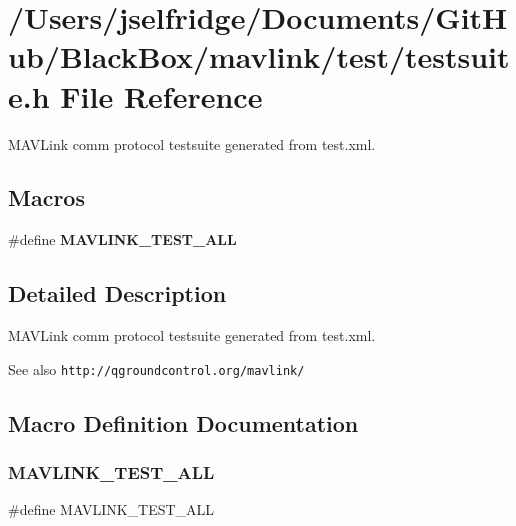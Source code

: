 \section{/\+Users/jselfridge/\+Documents/\+Git\+Hub/\+Black\+Box/mavlink/test/testsuite.h File Reference}
\label{test_2testsuite_8h}


M\+A\+V\+Link comm protocol testsuite generated from test.\+xml.  


\subsection*{Macros}
\begin{DoxyCompactItemize}
\item 
\#define \textbf{ M\+A\+V\+L\+I\+N\+K\+\_\+\+T\+E\+S\+T\+\_\+\+A\+LL}
\end{DoxyCompactItemize}


\subsection{Detailed Description}
M\+A\+V\+Link comm protocol testsuite generated from test.\+xml. 

\begin{DoxySeeAlso}{See also}
{\tt http\+://qgroundcontrol.\+org/mavlink/} 
\end{DoxySeeAlso}


\subsection{Macro Definition Documentation}
\mbox{\label{test_2testsuite_8h_ae706a993ca59ccc1a8a7c330f0b1ceec}} 
\subsubsection{M\+A\+V\+L\+I\+N\+K\+\_\+\+T\+E\+S\+T\+\_\+\+A\+LL}
{\footnotesize\ttfamily \#define M\+A\+V\+L\+I\+N\+K\+\_\+\+T\+E\+S\+T\+\_\+\+A\+LL}

